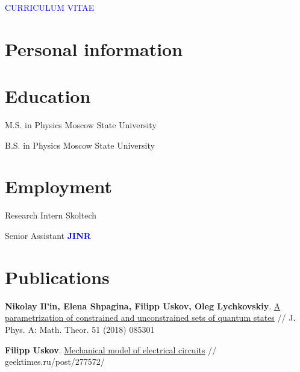 \documentclass[10pt,a4paper,sans]{moderncv}
\begin{document}

\begin{center}
\textcolor{blue}{\Large CURRICULUM VITAE}
\end{center}

\section{Personal information}

	


\section{Education}


{M.S. in Physics}
{}
{Moscow State University}
{}{}

{B.S. in Physics}
{}
{Moscow State University}
{}{}


\section{Employment}

	{Research Intern}{}
	{Skoltech}{}{}

	{Senior Assistant}{}
	{\textbf{\textcolor{blue}{JINR}}}{}{}

\section{Publications}

	{\textbf{Nikolay Il'in, Elena Shpagina, Filipp Uskov, Oleg Lychkovskiy}.
	{\textcolor{blue}{\href{http://iopscience.iop.org/article/10.1088/1751-8121/aaa32d/meta}{A parametrization of constrained and unconstrained sets of quantum states}}} //  J. Phys. A: Math. Theor. 51 (2018) 085301}

	{\textbf{Filipp Uskov}.
	{\textcolor{blue}{\href{https://habr.com/post/372403/}{Mechanical model of electrical circuits}}} //   geektimes.ru/post/277572/}
\end{document}
